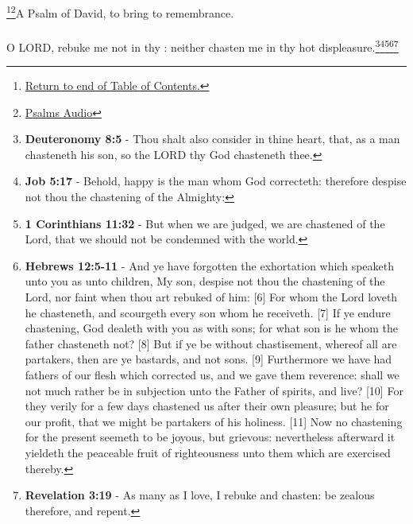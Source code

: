\footnote{\textcolor[cmyk]{0.99998,1,0,0}{\hyperlink{TOC}{Return to end of Table of Contents.}}}\footnote{\href{https://audiobible.com/bible/}{\textcolor[cmyk]{0.99998,1,0,0}{Psalms Audio}}}\textcolor[cmyk]{0.99998,1,0,0}{A Psalm of David, to bring to remembrance.}\\
\\
\textcolor[cmyk]{0.99998,1,0,0}{O LORD, rebuke me not in thy : neither chasten me in thy hot displeasure.}\footnote{\textbf{Deuteronomy 8:5} - Thou shalt also consider in thine heart, that, as a man chasteneth his son, so the LORD thy God chasteneth thee.}\footnote{\textbf{Job 5:17} - Behold, happy is the man whom God correcteth: therefore despise not thou the chastening of the Almighty:}\footnote{\textbf{1 Corinthians 11:32} - But when we are judged, we are chastened of the Lord, that we should not be condemned with the world.}\footnote{\textbf{Hebrews 12:5-11} - And ye have forgotten the exhortation which speaketh unto you as unto children, My son, despise not thou the chastening of the Lord, nor faint when thou art rebuked of him: [6] For whom the Lord loveth he chasteneth, and scourgeth every son whom he receiveth. [7] If ye endure chastening, God dealeth with you as with sons; for what son is he whom the father chasteneth not? [8] But if ye be without chastisement, whereof all are partakers, then are ye bastards, and not sons. [9] Furthermore we have had fathers of our flesh which corrected us, and we gave them reverence: shall we not much rather be in subjection unto the Father of spirits, and live? [10] For they verily for a few days chastened us after their own pleasure; but he for our profit, that we might be partakers of his holiness. [11] Now no chastening for the present seemeth to be joyous, but grievous: nevertheless afterward it yieldeth the peaceable fruit of righteousness unto them which are exercised thereby.}\footnote{\textbf{Revelation 3:19} - As many as I love, I rebuke and chasten: be zealous therefore, and repent.} %
